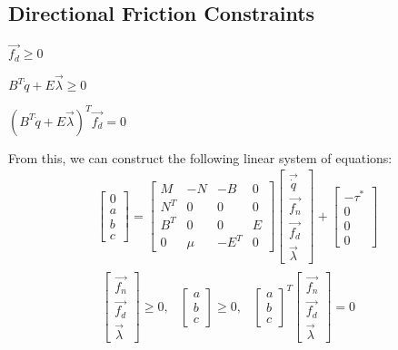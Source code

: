{\subsection{Directional Friction Constraints}
\begin{packed_item}
\item $\vec{f_d} \geq 0$
\item $B^T\dot{q} + E\vec{\lambda} \geq 0$
\item $(B^T\dot{q} + E\vec{\lambda})^T\vec{f_d} = 0$
\end{packed_item}
From this, we can construct the following linear system of equations:
\begin{equation}
\label{eq:bigsystem}
\begin{array}{cc}
\left[\begin{matrix}0 \\ a \\ b \\ c \end{matrix}\right] = \left[\begin{matrix}M & -N & -B & 0 \\ N^T & 0 & 0 & 0 \\ B^T & 0 & 0 & E \\ 0 & \mu & -E^T & 0\end{matrix}\right]\left[\begin{matrix}\vec{\dot{q}} \\ \vec{f_n} \\ \vec{f_d} \\ \vec{\lambda}\end{matrix}\right] + \left[\begin{matrix}-\tau^* \\ 0 \\ 0 \\0\end{matrix}\right] \\
\begin{matrix}
\left[\begin{matrix}\vec{f_n} \\ \vec{f_d} \\ \vec{\lambda}\end{matrix}\right] \geq 0, & 
\left[\begin{matrix}a \\ b \\ c\end{matrix}\right] \geq 0, &
\left[\begin{matrix}a \\ b \\ c\end{matrix}\right]^T\left[\begin{matrix}\vec{f_n} \\ \vec{f_d} \\ \vec{\lambda}\end{matrix}\right] = 0

\end{matrix}
\end{array}
\end{equation}}

